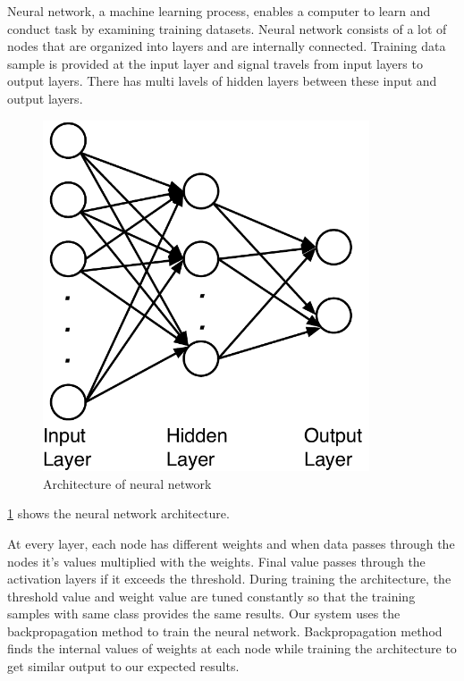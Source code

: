 Neural network, a machine learning process, enables a computer to learn and conduct task by examining training datasets.
Neural network consists of a lot of nodes that are organized into layers and are internally connected.
Training data sample is provided at the input layer and signal travels from input layers to output layers.
There has multi lavels of hidden layers between these input and output layers.
\begin{figure}[h]
\centering
\includegraphics[width=3.8in]{figures/nn.pdf}
\caption{Architecture of neural network}
\label{f:nn_archi}
\end{figure}

\ref{f:nn_archi} shows the neural network architecture.

At every layer, each node has different weights and when data passes through the nodes it's values multiplied with the weights.
Final value passes through the activation layers if it exceeds the threshold.
During training the architecture, the threshold value and weight value are tuned constantly so that the training samples with same class provides the same results.
Our system uses the backpropagation method to train the neural network.
Backpropagation method finds the internal values of weights at each node while training the architecture to get similar output to our expected results.










